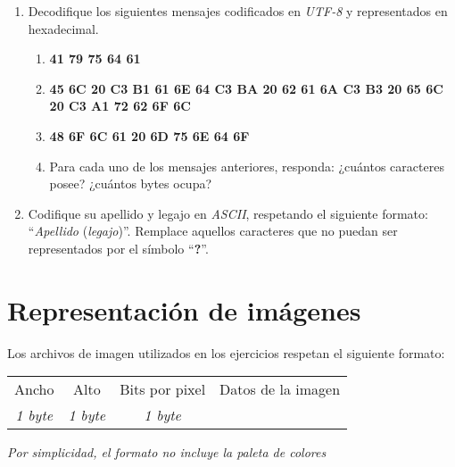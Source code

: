 \documentclass[12pt]{article}
\begin{document}
\begin{enumerate}

    \item Decodifique los siguientes mensajes codificados en \emph{UTF-8} y
        representados en hexadecimal.

        \begin{enumerate}

            \item \textbf{41 79 75 64 61}

            \item \textbf{45 6C 20 C3 B1 61 6E 64 C3 BA 20 62 61 6A C3 B3 20
                65 6C 20 C3 A1 72 62 6F 6C}

            \item \textbf{48 6F 6C 61 20 6D 75 6E 64 6F}

            \item Para cada uno de los mensajes anteriores, responda: ¿cuántos
                caracteres posee? ¿cuántos bytes ocupa?

        \end{enumerate}

    \item Codifique su apellido y legajo en \emph{ASCII}, respetando
        el siguiente formato: ``\textit{Apellido} (\textit{legajo})''.
        Remplace aquellos caracteres que no puedan ser representados por el
        símbolo ``\textbf{?}''.

\end{enumerate}

\section{Representación de imágenes}
\label{sec_imagenes}

Los archivos de imagen utilizados en los ejercicios respetan el siguiente
formato:

\begin{tabular}[t]{|c|c|c||c|}

    \hline

    Ancho&Alto& Bits por pixel & Datos de la imagen\\

    \emph{1 byte}& \emph{1 byte}& \emph{1 byte}&\\

    \hline

\end{tabular}

\emph{Por simplicidad, el formato no incluye la paleta de colores}
\end{document}
